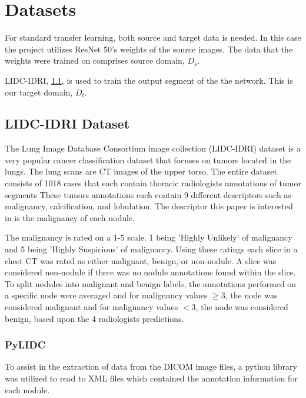 \documentclass[10pt,twocolumn,letterpaper]{article}
\begin{document}
\section{Datasets} \label{sec:data}
   For standard transfer learning, both source and target data is needed. In this case
   the project utilizes ResNet 50's weights of the source images. The data that the weights
   were trained on comprises source domain, $D_s$.

   LIDC-IDRI, \ref{sec:data-lidc}, is used to train the output segment of the
   the network. This is our target domain, $D_t$.

   \subsection{LIDC-IDRI Dataset} \label{sec:data-lidc}
      The Lung Image Database Consortium image collection (LIDC-IDRI) dataset
      is a very popular cancer classification dataset that focuses on tumors located
      in the lungs. The lung scans are CT images of the upper torso. The entire dataset
      consists of 1018 cases that each contain thoracic radiologists annotations of tumor segments
      These tumors annotations each contain 9 different descriptors such as malignancy,
      calcification, and lobulation. The descriptor this paper is interested in is the
      malignancy of each nodule.

      The malignancy is rated on a 1-5 scale. 1 being 'Highly Unlikely' of malignancy and
      5 being 'Highly Suspicious' of malignancy. Using these ratings each slice in a chest CT
      was rated as either malignant, benign, or non-nodule. A slice was considered non-nodule
      if there was no nodule annotations found within the slice. To split nodules into malignant
      and benign labels, the annotations performed on a specific node were averaged and for malignancy
      values $\ge 3$, the node was considered malignant and for malignancy values $< 3$, the node was
      considered benign, based upon the 4 radiologists predictions.

      \subsubsection{PyLIDC} \label{sec:data-lidc-pylidc}
         To assist in the extraction of data from the DICOM image files, a python library was utilized
         to read to XML files which contained the annotation information for each nodule. \cite{Hancock2018}
\end{document}
